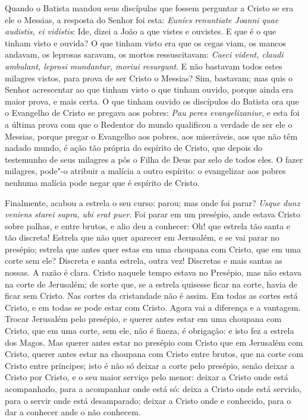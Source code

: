 Quando o Batista mandou seus discípulas que fossem perguntar a Cristo se
era ele o Messias, a resposta do Senhor foi esta: \emph{Euníes
renuntiate Joanni quae audistis, ei vidistis}: Ide, dizei a %
João a que vistes e ouvistes. E que é o que tinham visto e ouvida? O
que tinham visto era que os cegas viam, os mancos andavam, os leprosas
saravam, os mortos ressuscitavam: \emph{Caeci vident, claudi ambulant,
leprosi mundantur, moriui resurgunt}. E não bastavam todos %
estes milagres vistos, para prova de ser Cristo o Messias? Sim,
bastavam; mas quis o Senhor acrescentar ao que tinham visto o que tinham
ouvido, porque ainda era maior prova, e mais certa. O que tinham ouvido
os discípulos do Batista ora que o Evangelho de Cristo se pregava aos
pobres: \emph{Pau peres evangelizaniur}, e esta foi a última
prova com que o Redentor do mundo qualificou a verdade de ser ele o
Messias, porque pregar o Evangelho aos pobres, aos miseráveis, aos que
não têm nadado mundo, é ação tão própria do espírito de Cristo, que
depois do testemunho de seus milagres a pôs o Filha de Deus par selo de
todos eles. O fazer milagres, pode"-o atribuir a malícia a outro
espírito: o evangelizar aos pobres nenhuma malícia pode negar que é
espírito de Cristo.

Finalmente, acabou a estrela o seu curso: parou; mas onde foi parar?
\emph{Usque dunz veniens starei supra, ubi erat puer}. Foi
parar em um presépio, ande estava Cristo sobre palhas, e entre brutos, e
alio deu a conhecer: Oh! que estrela tão santa e tão discreta! Estrela
que não quer aparecer em Jerusalém, e se vai parar no presépio; estrela
que antes quer estas em uma choupana com Cristo, que em uma corte sem
ele? Discreta e santa estrela, outra vez! Discretas e mais santas as
nossas. A razão é clara. Cristo naquele tempo estava no Presépio, mas
não estava na corte de Jerusalém; de sorte que, se a estrela quisesse
ficar na corte, havia de ficar sem Cristo. Nas cortes da cristandade não
é assim. Em todas as cortes está Cristo, e em todas se pode estar com
Cristo. Agora vai a diferença e a vantagem. Trocar Jerusalém pelo
presépio, e querer antes estar em uma choupana com Cristo, que em uma
corte, sem ele, não é fineza, é obrigação: e isto fez a estrela dos
Magos. Mas querer antes estar no presépio com Cristo que em Jerusalém
com Cristo, querer antes estar na choupana com Cristo entre brutos, que
na corte com Cristo entre príncipes; isto é não só deixar a corte pelo
presépio, senão deixar a Cristo por Cristo, e o seu maior serviço pelo
menor: deixar a Cristo onde está acompanhado, para a acompanhar onde
está só: deixa a Cristo onde
está servido, para o servir onde está desamparado; deixar a Cristo onde
e conhecido, para o dar a conhecer ande o não conhecem.

